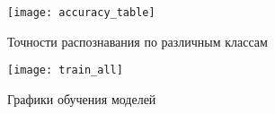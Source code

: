 \begin{figure}[H]
    \centering
    \texttt{[image: accuracy\_table]}
    \vspace*{-2cm}
    \caption{Точности распознавания по различным классам}
    \label{table-accuracy}
\end{figure}

\begin{figure}[H]
    \centering
    \texttt{[image: train\_all]}
    \vspace*{-1.3cm}
    \caption{Графики обучения моделей}
    \label{fig:train_all}
\end{figure}